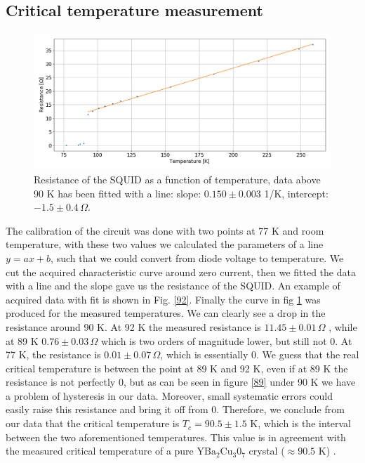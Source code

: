 \documentclass[a4paper,10pt]{article}
\begin{document}
\subsection{Critical temperature measurement}
\begin{figure}[H]
\centering
\includegraphics[width = \textwidth]{img/tempR.png}
\caption{Resistance of the SQUID as a function of temperature, data above 90 K has been fitted with a line: slope: $0.150\pm 0.003$ 1/K, intercept: $-1.5\pm0.4\,\Omega$.}\label{resistance}
\end{figure}
The calibration of the circuit was done with two points at 77 K and room temperature, with these two values we calculated the parameters of a line $y=ax+b$, such that we could convert from diode voltage to temperature. We cut the acquired characteristic curve around zero current, then we fitted the data with a line and the slope gave us the resistance of the SQUID. An example of acquired data with fit is shown in Fig. \ref{92}. Finally the curve in fig \ref{resistance} was produced for the measured temperatures. We can clearly see a drop in the resistance around 90 K. 
At 92 K the measured resistance is $11.45 \pm  0.01 \, \Omega$ , while at 89 K $0.76\pm 0.03\, \Omega$ which is two orders of magnitude lower, but still not 0. At 77 K, the resistance is
$0.01\pm 0.07\, \Omega$, which is essentially 0. We guess that the real critical temperature is between the point at 89 K and 92 K, even if at 89 K the resistance is not perfectly 0, but as can be seen in figure \ref{89} under 90 K we have a problem of hysteresis in our data. Moreover, small systematic errors could easily raise this resistance and bring it off from 0. Therefore, we conclude from our data that the critical temperature is $T_c = 90.5 \pm 1.5$ K, which is the interval between the two aforementioned temperatures. This value is in agreement with the measured critical temperature of a pure $\text{YBa}_2\text{Cu}_3\text{0}_7$ crystal ($\approx 90.5$ K) \cite{criticaltemperature}.
\end{document}
